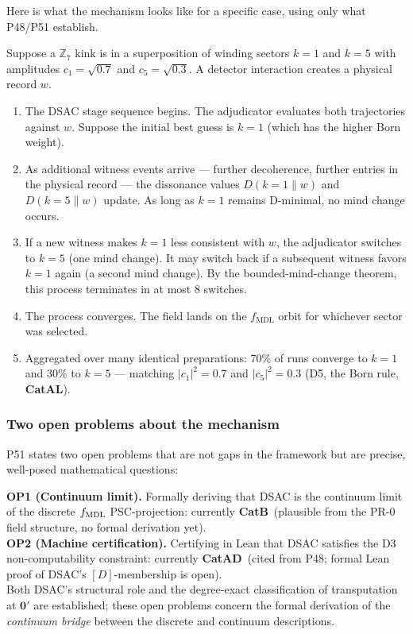 \documentclass[11pt,a4paper]{article}
\newcommand{\CatAL}{\textbf{CatAL}}
\newcommand{\CatAD}{\textbf{CatAD}}
\newcommand{\CatB}{\textbf{CatB}}
\begin{document}
Here is what the mechanism looks like for a specific case, using only what P48/P51
establish.

Suppose a $\mathbb{Z}_7$ kink is in a superposition of winding sectors $k=1$ and
$k=5$ with amplitudes $c_1 = \sqrt{0.7}$ and $c_5 = \sqrt{0.3}$.  A detector
interaction creates a physical record $w$.

\begin{enumerate}
  \item The DSAC stage sequence begins.  The adjudicator evaluates both
    trajectories against $w$.  Suppose the initial best guess is $k=1$ (which
    has the higher Born weight).

  \item As additional witness events arrive --- further decoherence, further
    entries in the physical record --- the dissonance values $D(k=1 \| w)$ and
    $D(k=5 \| w)$ update.  As long as $k=1$ remains D-minimal, no mind change
    occurs.

  \item If a new witness makes $k=1$ less consistent with $w$, the adjudicator
    switches to $k=5$ (one mind change).  It may switch back if a subsequent
    witness favors $k=1$ again (a second mind change).  By the bounded-mind-change
    theorem, this process terminates in at most 8 switches.

  \item The process converges.  The field lands on the $f_{\mathrm{MDL}}$ orbit
    for whichever sector was selected.

  \item Aggregated over many identical preparations: 70\% of runs converge to
    $k=1$ and 30\% to $k=5$ --- matching $|c_1|^2 = 0.7$ and $|c_5|^2 = 0.3$
    (D5, the Born rule, \CatAL).
\end{enumerate}

\subsubsection*{Two open problems about the mechanism}

P51 states two open problems that are not gaps in the framework but are precise,
well-posed mathematical questions:

\begin{tcolorbox}[colback=boxyellow,colframe=yellow!70!black,
  title=Open problems about DSAC (from P51),breakable]
\textbf{OP1 (Continuum limit).}  Formally deriving that DSAC is the continuum limit
of the discrete $f_{\rm MDL}$ PSC-projection: currently \CatB\ (plausible from the
PR-0 field structure, no formal derivation yet).\\[6pt]
\textbf{OP2 (Machine certification).}  Certifying in Lean that DSAC satisfies the D3
non-computability constraint: currently \CatAD\ (cited from P48; formal Lean proof of
DSAC's $[D]$-membership is open).\\[6pt]
Both DSAC's structural role and the degree-exact classification of transputation at
$\mathbf{0}'$ are established; these open problems concern the formal derivation of
the \emph{continuum bridge} between the discrete and continuum descriptions.
\end{tcolorbox}
\end{document}

